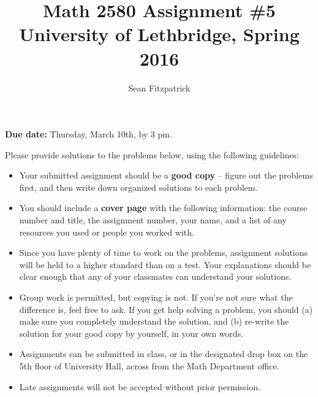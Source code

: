 \documentclass[letterpaper,12pt]{article}
\title{Math 2580 Assignment \#5\\University of Lethbridge, Spring 2016}
\author{Sean Fitzpatrick}
\begin{document}
 \maketitle

{\bf Due date:} Thursday, March 10th, by 3 pm.

\bigskip

Please provide solutions to the problems below, using the following guidelines:
\begin{itemize}
\item Your submitted assignment should be a {\bf good copy} -- figure out the problems first, and then write down organized solutions to each problem. 
\item You should include a {\bf cover page} with the following information: the course number and title, the assignment number, your name, and a list of any resources you used or people you worked with.
\item Since you have plenty of time to work on the problems, assignment solutions will be held to a higher standard than on a test. Your explanations should be clear enough that any of your classmates can understand your solutions.
\item Group work is permitted, but copying is not. If you're not sure what the difference is, feel free to ask. If you get help solving a problem, you should (a) make sure you completely understand the solution, and (b) re-write the solution for your good copy by yourself, in your own words.
\item Assignments can be submitted in class, or in the designated drop box on the 5th floor of University Hall, across from the Math Department office.
\item Late assignments will not be accepted without prior permission.

\end{itemize}
\newpage
\end{document}
